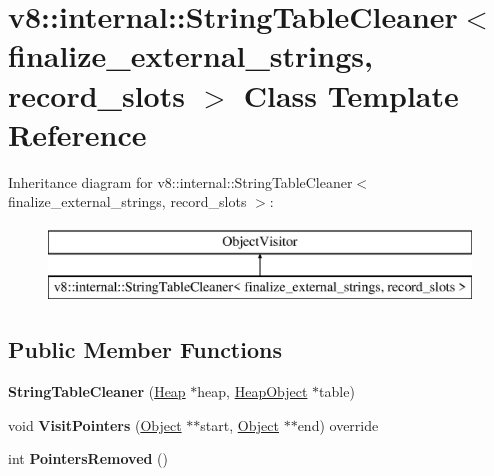 \hypertarget{classv8_1_1internal_1_1_string_table_cleaner}{}\section{v8\+:\+:internal\+:\+:String\+Table\+Cleaner$<$ finalize\+\_\+external\+\_\+strings, record\+\_\+slots $>$ Class Template Reference}
\label{classv8_1_1internal_1_1_string_table_cleaner}
Inheritance diagram for v8\+:\+:internal\+:\+:String\+Table\+Cleaner$<$ finalize\+\_\+external\+\_\+strings, record\+\_\+slots $>$\+:\begin{figure}[H]
\begin{center}
\leavevmode
\includegraphics[height=2.000000cm]{classv8_1_1internal_1_1_string_table_cleaner}
\end{center}
\end{figure}
\subsection*{Public Member Functions}
\begin{DoxyCompactItemize}
\item 
{\bfseries String\+Table\+Cleaner} (\hyperlink{classv8_1_1internal_1_1_heap}{Heap} $\ast$heap, \hyperlink{classv8_1_1internal_1_1_heap_object}{Heap\+Object} $\ast$table)\hypertarget{classv8_1_1internal_1_1_string_table_cleaner_ad61246303cebcc3b3fa7be584e22c580}{}\label{classv8_1_1internal_1_1_string_table_cleaner_ad61246303cebcc3b3fa7be584e22c580}

\item 
void {\bfseries Visit\+Pointers} (\hyperlink{classv8_1_1internal_1_1_object}{Object} $\ast$$\ast$start, \hyperlink{classv8_1_1internal_1_1_object}{Object} $\ast$$\ast$end) override\hypertarget{classv8_1_1internal_1_1_string_table_cleaner_a3573d9d5804c36a34bc6e46f21a66456}{}\label{classv8_1_1internal_1_1_string_table_cleaner_a3573d9d5804c36a34bc6e46f21a66456}

\item 
int {\bfseries Pointers\+Removed} ()\hypertarget{classv8_1_1internal_1_1_string_table_cleaner_a72aa67dbb126da18b89f19b044201649}{}\label{classv8_1_1internal_1_1_string_table_cleaner_a72aa67dbb126da18b89f19b044201649}

\end{DoxyCompactItemize}
